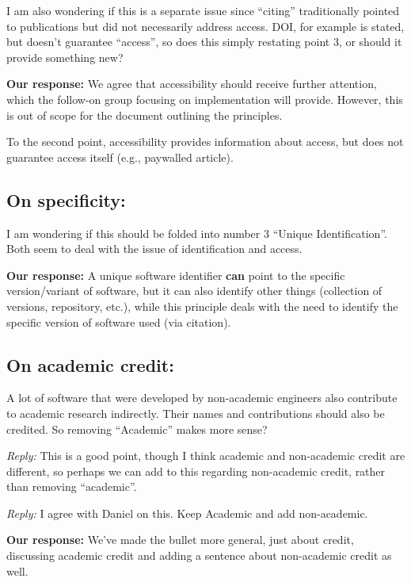\documentclass[12pt, oneside]{amsart}
\begin{document}
I am also wondering if this is a separate issue since ``citing'' traditionally pointed to publications but did not necessarily address access. DOI, for example is stated, but doesn't guarantee ``access'', so does this simply restating point 3, or should it provide something new?

\textbf{Our response:}
We agree that accessibility should receive further attention, which the follow-on group focusing on implementation will provide. However, this is out of scope for the document outlining the principles.

To the second point, accessibility provides information about access, but does not guarantee access itself (e.g., paywalled article).

\subsection{On specificity:} I am wondering if this should be folded into number 3 ``Unique Identification''. Both seem to deal with the issue of identification and access.

\textbf{Our response:} A unique software identifier \textbf{can} point to the specific version\slash variant of software, but it can also identify other things (collection of versions, repository, etc.), while this principle deals with the need to identify the specific version of software used (via citation).

\subsection{On academic credit:} A lot of software that were developed by non-academic engineers also contribute to academic research indirectly. Their names and contributions should also be credited. So removing ``Academic'' makes more sense?

\emph{Reply:} This is a good point, though I think academic and non-academic credit are different, so perhaps we can add to this regarding non-academic credit, rather than removing ``academic''.

\emph{Reply:} I agree with Daniel on this. Keep Academic and add non-academic.

\textbf{Our response:} We've made the bullet more general, just about credit, discussing academic credit and adding a sentence about non-academic credit as well.
\end{document}
